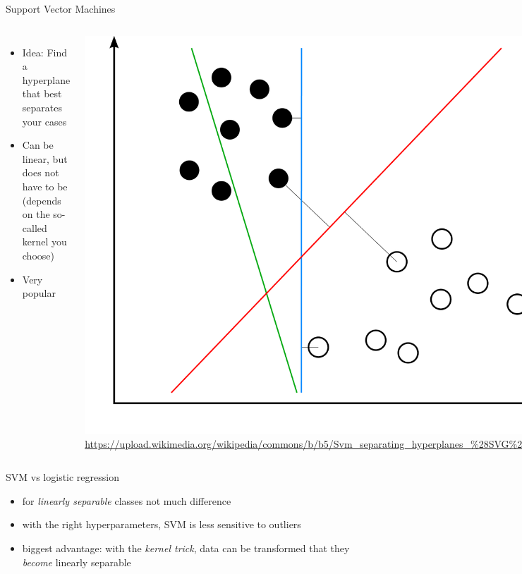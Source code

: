 \documentclass[compress]{beamer}
\begin{document}
\begin{frame}{Support Vector Machines}
	\begin{columns}
		\begin{itemize}
			\item	Idea: Find a hyperplane that best separates your cases
			\item Can be linear, but does not have to be (depends on the so-called kernel you choose)
			\item Very popular 
		\end{itemize}
		\includegraphics[width=.8\linewidth,height=.5\paperheight,keepaspectratio]{../pictures/svm}
		\tiny{\url{https://upload.wikimedia.org/wikipedia/commons/b/b5/Svm\_separating\_hyperplanes\_\%28SVG\%29.svg}}
	\end{columns}
	\vfill
\end{frame}

\begin{frame}{SVM vs logistic regression}
\begin{itemize}
	\item for \emph{linearly separable} classes not much difference
	\item with the right hyperparameters, SVM is less sensitive to outliers
	\item biggest advantage: with the \emph{kernel trick}, data can be transformed that they \emph{become} linearly separable
\end{itemize}
\end{frame}
\end{document}
